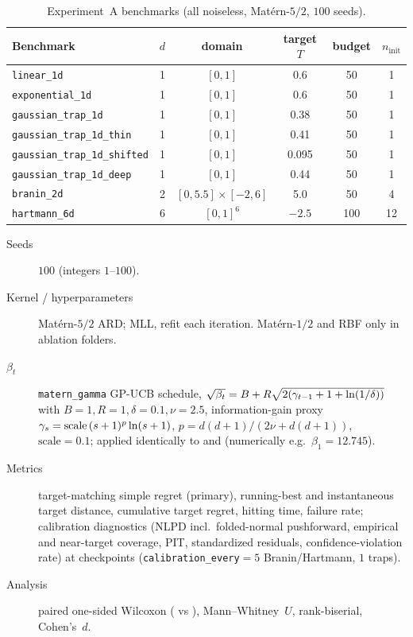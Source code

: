 \begin{table}[htbp]\centering\small
\caption{Experiment~A benchmarks (all noiseless, Mat\'ern-$5/2$, $100$ seeds).}
\label{tab:expA}
\begin{tabular}{@{}lccccc@{}}
\toprule
Benchmark & $d$ & domain & target $T$ & budget & $n_{\mathrm{init}}$ \\
\midrule
\texttt{linear\_1d} & 1 & $[0,1]$ & 0.6 & 50 & 1 \\
\texttt{exponential\_1d} & 1 & $[0,1]$ & 0.6 & 50 & 1 \\
\texttt{gaussian\_trap\_1d} & 1 & $[0,1]$ & 0.38 & 50 & 1 \\
\texttt{gaussian\_trap\_1d\_thin} & 1 & $[0,1]$ & 0.41 & 50 & 1 \\
\texttt{gaussian\_trap\_1d\_shifted} & 1 & $[0,1]$ & 0.095 & 50 & 1 \\
\texttt{gaussian\_trap\_1d\_deep} & 1 & $[0,1]$ & 0.44 & 50 & 1 \\
\texttt{branin\_2d} & 2 & $[0,5.5]\times[-2,6]$ & 5.0 & 50 & 4 \\
\texttt{hartmann\_6d} & 6 & $[0,1]^6$ & $-2.5$ & 100 & 12 \\
\bottomrule
\end{tabular}
\end{table}

\begin{description}
  \item[Seeds] $100$ (integers $1$--$100$).
  \item[Kernel / hyperparameters] Mat\'ern-$5/2$ ARD; MLL, refit each iteration.
        Mat\'ern-$1/2$ and RBF only in ablation folders.
  \item[$\beta_t$] \texttt{matern\_gamma} GP-UCB schedule,
        $\sqrt{\beta_t}=B+R\sqrt{2(\gamma_{t-1}+1+\ln(1/\delta))}$ with
        $B=1,R=1,\delta=0.1,\nu=2.5$, information-gain proxy
        $\gamma_s=\text{scale}\,(s+1)^p\ln(s+1)$, $p=d(d+1)/(2\nu+d(d+1))$,
        $\text{scale}=0.1$; applied identically to \RIGHT{} and \WRONG{}
        (numerically e.g.\ $\beta_1=12.745$).
  \item[Metrics] target-matching simple regret (primary), running-best and
        instantaneous target distance, cumulative target regret, hitting time,
        failure rate; calibration diagnostics (NLPD incl.\ folded-normal
        pushforward, empirical and near-target coverage, PIT, standardized
        residuals, confidence-violation rate) at checkpoints
        (\texttt{calibration\_every}$=5$ Branin/Hartmann, $1$ traps).
  \item[Analysis] paired one-sided Wilcoxon (\RIGHT{} vs \WRONG),
        Mann--Whitney~$U$, rank-biserial, Cohen's~$d$.
\end{description}


